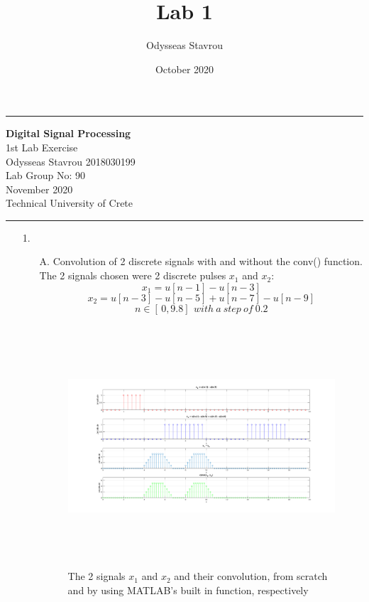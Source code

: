 \documentclass[12pt, a4paper]{article}
\title{Lab 1}
\author{Odysseas Stavrou}
\date{October 2020}
\begin{document}
\noindent\rule{\textwidth}{1.5pt}

\begin{center}
{\bf Digital Signal Processing} \\ 
 1st Lab Exercise\\
 Odysseas Stavrou 2018030199\\
 Lab Group No: 90\\
 November 2020\\
 Technical University of Crete\\
\end{center}
\noindent\rule{\textwidth}{1.5pt}


\begin{enumerate}
    \item[1.]~
    \begin{enumerate}
        \item[A.]Convolution of 2 discrete signals with and without the conv() function.
        The 2 signals chosen were 2 discrete pulses \(x_1\) and \(x_2\):
        \[x_1 = u[n-1] - u[n-3]\]
        \[x_2 = u[n-3] - u[n-5] + u[n-7] - u[n-9]\]
        \[n \in [\,0,9.8]\,\ with\ a\ step\ of\ 0.2\]

        \begin{figure}[H]
            \centering
            \includegraphics[width=\textwidth, height=9cm]{A_1.png}
            \caption{The 2 signals \(x_1\) and \(x_2\) and their convolution, from scratch and by using MATLAB's built in function, respectively}
        \end{figure}


\end{enumerate}
\end{enumerate}
\end{document}
